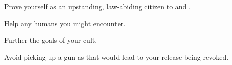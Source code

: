 \documentclass[char]{guildcamp4}
\begin{document}
\begin{itemz}[Goals]
	\item Prove yourself as an upstanding, law-abiding citizen to \cCbad{} and \cCgood{}.
	\item Help any humans you might encounter.
	\item Further the goals of your cult.
	\item Avoid picking up a gun as that would lead to your release being revoked.
\end{itemz}

\begin{contacts}
	\contact{\cCbad{}} 
	\contact{\cCgood{}}
\end{contacts}
\end{document}
